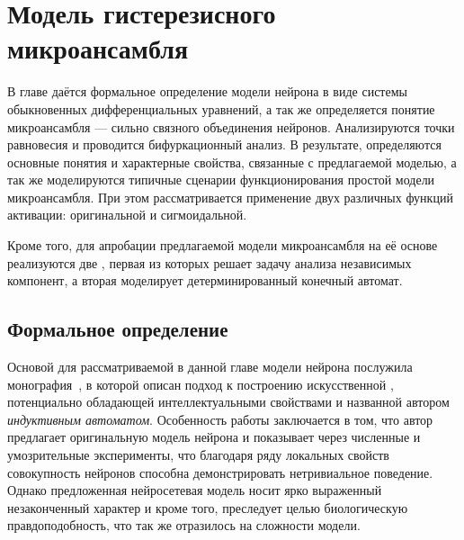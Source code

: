 \chapter{Модель гистерезисного микроансамбля} \label{chapter:neuron}

В главе даётся формальное определение модели нейрона в виде системы обыкновенных дифференциальных уравнений, а так же определяется понятие микроансамбля --- сильно связного объединения нейронов. Анализируются точки равновесия и проводится бифуркационный анализ. В результате, определяются основные понятия и характерные свойства, связанные с предлагаемой моделью, а так же моделируются типичные сценарии функционирования простой модели микроансамбля. При этом рассматривается применение двух различных функций активации: оригинальной и сигмоидальной. 

Кроме того, для апробации предлагаемой модели микроансамбля на её основе реализуются две , первая из которых решает задачу анализа независимых компонент, а вторая моделирует детерминированный конечный автомат. 


\section{Формальное определение} \label{section:neuron_model}

Основой для рассматриваемой в данной главе модели нейрона послужила монография~\cite{EmelyanovYaroslavsky1990}, в которой описан подход к построению искусственной , потенциально обладающей интеллектуальными свойствами и названной автором \textit{индуктивным автоматом}. Особенность работы заключается в том, что автор предлагает оригинальную модель нейрона и показывает через численные и умозрительные эксперименты, что благодаря ряду локальных свойств совокупность нейронов способна демонстрировать нетривиальное поведение. Однако предложенная нейросетевая модель носит ярко выраженный незаконченный характер и кроме того, преследует целью биологическую правдоподобность, что так же отразилось на сложности модели.

